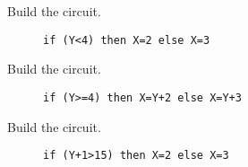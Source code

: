 
\begin{description}

    \item[Build the circuit.]
\begin{verbatim}
if (Y<4) then X=2 else X=3
\end{verbatim}
        \vspace{1in}

    \item[Build the circuit.]
\begin{verbatim}
if (Y>=4) then X=Y+2 else X=Y+3
\end{verbatim}
        \vspace{1in}

    \item[Build the circuit.]
\begin{verbatim}
if (Y+1>15) then X=2 else X=3
\end{verbatim}

\end{description}

